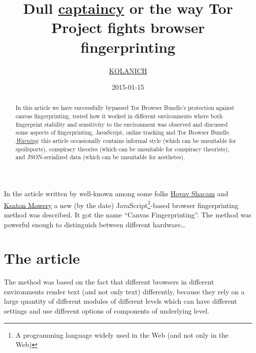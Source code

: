 \documentclass[letterpaper,14pt]{article}
\begin{document}
\title{Dull \href{https://encyclopediadramatica.rs/Captain_Obvious}{captaincy} or the way Tor Project fights browser fingerprinting}
\author{\href{https://gitlab.com/KOLANICH1}{KOLANICH}}
\date{2015-01-15}
\maketitle
\begin{abstract}\label{abstract}
In this article we have successfully bypassed Tor Browser Bundle's protection against canvas fingerprinting, tested how it worked in different environments where both fingerprint stability and sensitivity to the environment was observed and discussed some aspects of fingerprinting, JavaScript, online tracking and Tor Browser Bundle.\\

\emph{\href{https://xkcd.com/}{Warning}}: this article occasionally contains informal style (which can be unsuitable for spoilsports), conspiracy theories (which can be unsuitable for conspiracy theorists), and JSON-serialized data (which can be unsuitable for aesthetes).
\end{abstract}
\doclicenseThis
\newpage
\tableofcontents
\newpage

In the article \cite{MS12} written by well-known among some folks \href{https://cseweb.ucsd.edu/~hovav/papers.html}{Hovav Shacam} and \href{https://cseweb.ucsd.edu/~kmowery/}{Keaton Mowery} a new (by the date) JavaScript\footnote{A programming language widely used in the Web (and not only in the Web)}-based browser fingerprinting\cite{Eckersley2010} method was described. It got the name ``Canvas Fingerprinting''. The method was powerful enough to distinguish between different hardware\ldots{}

\section{The article}\label{the-article}

The method was based on the fact that different browsers in different environments render text (and not only text) differently, because they rely on a large quantity of different modules of different levels which can have different settings and use different options of components of underlying level.
\end{document}
